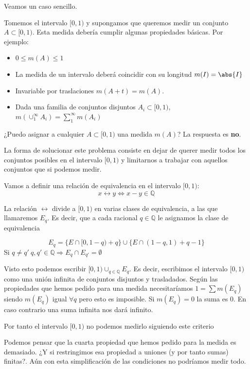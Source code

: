 \documentclass{apuntes}
\begin{document}
Veamos un caso sencillo.
\begin{example}
Tomemos el intervalo $[0,1)$ y supongamos que queremos medir un conjunto $A\subset [0,1)$. Esta medida debería cumplir algunas propiedades básicas. Por ejemplo:
\begin{itemize}
\item $0\leq m(A) \leq 1$
\item La medida de un intervalo deberá coincidir con su longitud $m(I)=\abs{I}$
\item Invariable por traslaciones $m(A+t) = m(A)$.
\item Dada una familia de conjuntos disjuntos $A_i\subset [0,1)$, $m(\cup_{1}^{\infty} A_i) = \sum_{1}^{\infty}m(A_i)$
\end{itemize}

¿Puedo asignar a cualquier $A \subset [0,1)$ una medida $m(A)$? La respuesta es \textbf{no}.

La forma de solucionar este problema consiste en dejar de querer medir todos los conjuntos posibles en el intervalo $[0,1)$ y limitarnos a trabajar con aquellos conjuntos que si podemos medir.

Vamos a definir una relación de equivalencia en el intervalo $[0,1)$: \[ x\rel y \iff x-y \in\mathbb{Q} \]

La relación $\rel$ divide a $[0,1)$ en varias clases de equivalencia, a las que llamaremos $E_q$. Es decir, que a cada racional $q ∈ ℚ$ le asignamos la clase de equivalencia 

\[E_q = \lbrace E\cap [0, 1-q) +q \rbrace \cup \lbrace E\cap (1-q, 1) + q - 1\rbrace\]
Si $q \neq q' \ q,q'\in \mathbb{Q} \Rightarrow E_q\cap E_{q'} = \emptyset$

Visto esto podemos escribir $[0,1)\cup_{q\in \mathbb{Q}}E_q$. Es decir, escribimos el intervalo $[0,1)$ como una unión infinita de conjuntos disjuntos y trasladados. Según las propiedades que hemos pedido para una medida necesitaríamos $1 = \sum m(E_q)$ siendo $m(E_q)$ igual $\forall q$  pero esto es imposible. Si $m(E_q) = 0$ la suma es 0. En caso contrario una suma infinita nos dará infinito.

Por tanto el intervalo $[0,1)$ no podemos medirlo siguiendo este criterio

\end{example}

Podemos pensar que la cuarta propiedad que hemos pedido para la medida es demasiado. ¿Y si restringimos esa propiedad a uniones (y por tanto sumas) finitas?. Aún con esta simplificación de las condiciones no podríamos medir todo.
\end{document}
